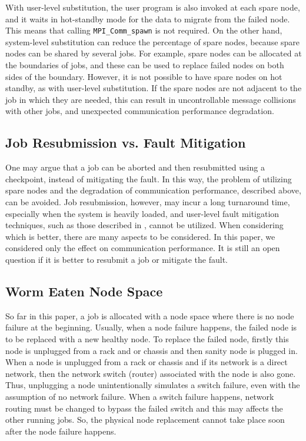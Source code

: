 \documentclass[Afour,times,sagev]{sagej}
\begin{document}
With user-level substitution, the user program is also invoked at each
spare node, and it waits in hot-standby mode for the data to migrate
from the failed node. This means that calling {\tt MPI\_Comm\_spawn}
is not required. On the other hand, system-level substitution can
reduce the percentage of spare nodes, because spare nodes can be
shared by several jobs. For example, spare nodes can be allocated at
the boundaries of jobs, and these can be used to replace failed nodes
on both sides of the boundary. However, it is not possible to have
spare nodes on hot standby, as with user-level substitution. If the
spare nodes are not adjacent to the job in which they are needed, this
can result in uncontrollable message collisions with other jobs, and
unexpected communication performance degradation.

\subsection{Job Resubmission vs. Fault Mitigation}

One may argue that a job can be aborted and then resubmitted using a
checkpoint, instead of mitigating the fault. In this way, the problem
of utilizing spare nodes and the degradation of communication
performance, described above, can be avoided. Job resubmission,
however, may incur a long turnaround time, especially when the system
is heavily loaded, and user-level fault mitigation techniques, such as
those described in \citep{Davies:2011:HPL:1995896.1995923}, cannot be
utilized. When considering which is better, there are many aspects to
be considered. In this paper, we considered only the effect on
communication performance. It is still an open question if it is
better to resubmit a job or mitigate the fault.

\subsection{Worm Eaten Node Space}

So far in this paper, a job is allocated with a node space where there
is no node failure at the beginning. Usually, when a node failure
happens, the failed node is to be replaced with a new healthy
node. To replace the failed node, firstly this node is unplugged from
a rack and or chassis and then sanity node is plugged in. When a node
is unplugged from a rack or chassis and if its network is a direct
network, then the network switch (router) associated with the node is
also gone. Thus, unplugging a node unintentionally simulates a switch
failure, even with the assumption of no network failure. When a
switch failure happens, network routing must be changed to bypass the
failed switch and this may affects the other running jobs. So, the
physical node replacement cannot take place soon after the node
failure happens. 
\end{document}
